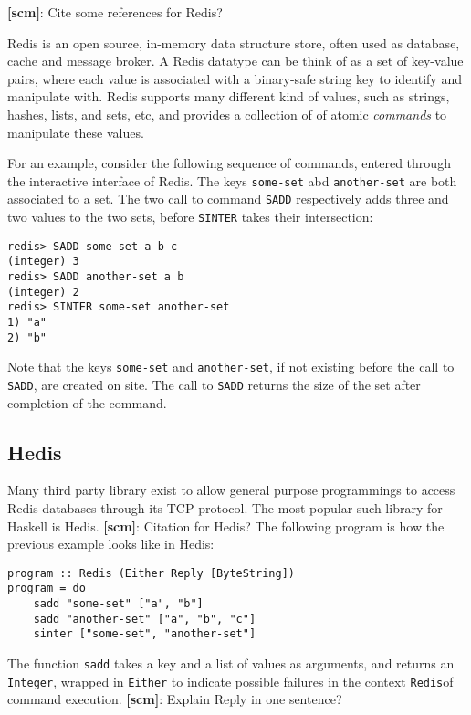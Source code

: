 \documentclass[pldi]{sigplanconf-pldi16}
\newcommand{\todo}[2]{{\bf [#1]}: #2}
\begin{document}
\todo{scm}{Cite some references for Redis?}

Redis is an open source, in-memory data structure store, often used as
database, cache and message broker. A Redis datatype can be think of as a set of key-value pairs, where each value is associated with a binary-safe string key to identify and manipulate with. Redis supports many different kind of values, such as strings, hashes, lists, and sets, etc, and provides a collection of of atomic \emph{commands} to manipulate these values.

For an example, consider the following sequence of commands, entered through the interactive interface of Redis. The keys
\texttt{some-set} abd \texttt{another-set} are
both associated to a set. The two call to command \texttt{SADD} respectively adds three and two values to the two sets, before \texttt{SINTER} takes their intersection:
\begin{verbatim}
redis> SADD some-set a b c
(integer) 3
redis> SADD another-set a b
(integer) 2
redis> SINTER some-set another-set
1) "a"
2) "b"
\end{verbatim}

Note that the keys \texttt{some-set} and \texttt{another-set}, if not existing before the call to \texttt{SADD}, are created on site. The call to
\texttt{SADD} returns the size of the set after
completion of the command.

\subsection{Hedis}

Many third party library exist to allow general purpose programmings
to access Redis databases through its TCP protocol. The most popular
such library for Haskell is Hedis.
%
\todo{scm}{Citation for Hedis?}
%
The following program is how the previous example looks like in
Hedis:

\begin{verbatim}
program :: Redis (Either Reply [ByteString])
program = do
    sadd "some-set" ["a", "b"]
    sadd "another-set" ["a", "b", "c"]
    sinter ["some-set", "another-set"]
\end{verbatim}

The function \texttt{sadd} takes a key and a list of values as arguments, and
 returns an \texttt{Integer}, wrapped in
 \texttt{Either} to indicate possible failures in the context
 \texttt{Redis}\footnotemark of command execution.
\todo{scm}{Explain Reply in one sentence?}
\end{document}
